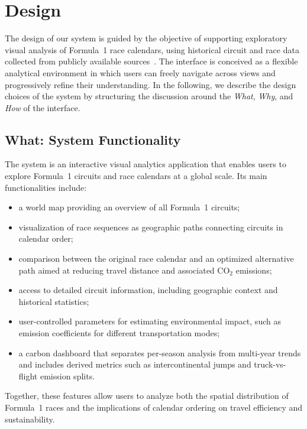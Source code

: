 \documentclass{egpubl}
\begin{document}
\section{Design}
\label{sec:design}

The design of our system is guided by the objective of supporting exploratory visual analysis of Formula~1 race calendars, using historical circuit and race data collected from publicly available sources~\cite{f1dataset}.
The interface is conceived as a flexible analytical environment in which users can freely navigate across views and progressively refine their understanding. In the following, we describe the design choices of the system by structuring the discussion around the \emph{What}, \emph{Why}, and \emph{How} of the interface.

\subsection{What: System Functionality}

The system is an interactive visual analytics application that enables users to explore Formula~1 circuits and race calendars at a global scale. Its main functionalities include:
\begin{itemize}
    \item a world map providing an overview of all Formula~1 circuits;
    \item visualization of race sequences as geographic paths connecting circuits in calendar order;
    \item comparison between the original race calendar and an optimized alternative path aimed at reducing travel distance and associated CO$_2$ emissions;
    \item access to detailed circuit information, including geographic context and historical statistics;
    \item user-controlled parameters for estimating environmental impact, such as emission coefficients for different transportation modes;
    \item a carbon dashboard that separates per-season analysis from multi-year trends and includes derived metrics such as intercontinental jumps and truck-vs-flight emission splits.
\end{itemize}

Together, these features allow users to analyze both the spatial distribution of Formula~1 races and the implications of calendar ordering on travel efficiency and sustainability.
\end{document}
